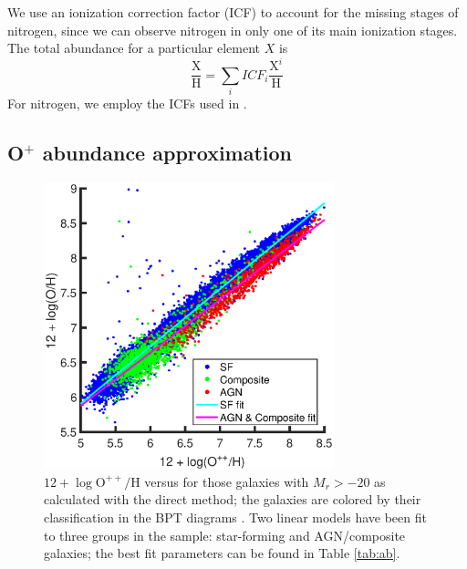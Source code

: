 We use an ionization correction factor (ICF) to account for the missing stages 
of nitrogen, since we can observe nitrogen in only one of its main ionization 
stages.  The total abundance for a particular element $X$ is 
\begin{equation}
    \frac{\text{X}}{\text{H}} = \sum_i ICF_i \frac{\text{X}^i}{\text{H}}
\end{equation}
For nitrogen, we employ the ICFs used in \cite{Douglass17b}.


\subsection{O$^+$ abundance approximation}\label{sec:Oplus_approx}

\begin{figure}
    \centering
    \includegraphics[width=0.75\textwidth]{Images/Paper3/Zlow_v_Zreal_1sig_I06_BPTclass_fits}
    \caption[O$^{++}$/H versus O/H]{$12 + \log{\text{O}^{++}/\text{H}}$ versus 
    \OH for those galaxies with $M_r > -20$ as calculated with the direct 
    method; the galaxies are colored by their classification in the BPT diagrams 
    \citep[from][]{Brinchmann04}.  Two linear models have been fit to three 
    groups in the sample: star-forming and AGN/composite galaxies; the best fit 
    parameters can be found in Table \ref{tab:ab}.}
    \label{fig:lowVreal}
\end{figure}

